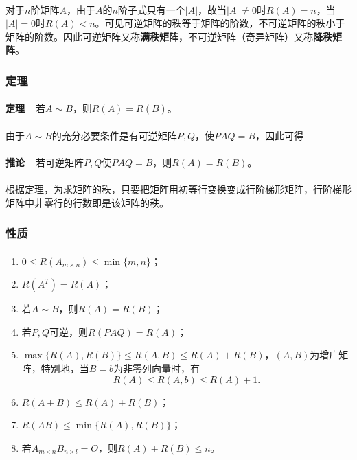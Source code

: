 \paragraph{}
对于$n$阶矩阵$A$，由于$A$的$n$阶子式只有一个$|A|$，故当$|A|\neq 0$时$R(A)=n$，当$|A|=0$时$R(A)<n$。可见可逆矩阵的秩等于矩阵的阶数，不可逆矩阵的秩小于矩阵的阶数。因此可逆矩阵又称\textbf{满秩矩阵}，不可逆矩阵（奇异矩阵）又称\textbf{降秩矩阵}。

\subsubsection{定理}
\paragraph{}
\textbf{定理~~}若$A\sim B$，则$R(A)=R(B)$。

\paragraph{}
由于$A\sim B$的充分必要条件是有可逆矩阵$P, Q$，使$PAQ=B$，因此可得

\paragraph{}
\textbf{推论~~}若可逆矩阵$P,Q$使$PAQ=B$，则$R(A)=R(B)$。

\paragraph{}
根据定理，为求矩阵的秩，只要把矩阵用初等行变换变成行阶梯形矩阵，行阶梯形矩阵中非零行的行数即是该矩阵的秩。

\subsubsection{性质}
\paragraph{}
\begin{enumerate}
  \item $0\leq R(A_{m\times n})\leq\min\{m,n\}$；
  \item $R(A^T)=R(A)$；
  \item 若$A\sim B$，则$R(A)=R(B)$；
  \item 若$P, Q$可逆，则$R(PAQ)=R(A)$；
  \item $\max\{R(A),R(B)\}\leq R(A,B)\leq R(A)+R(B)${\color{gray!50}，$(A,B)$为增广矩阵}，特别地，当$B=b$为非零列向量时，有
  \begin{equation*}
    R(A)\leq R(A,b) \leq R(A) + 1.
  \end{equation*}
  \item $R(A+B)\leq R(A)+R(B)$；
  \item $R(AB)\leq\min\{R(A),R(B)\}$；
  \item 若$A_{m\times n}B_{n\times l} = O$，则$R(A)+R(B)\leq n$。
\end{enumerate}

